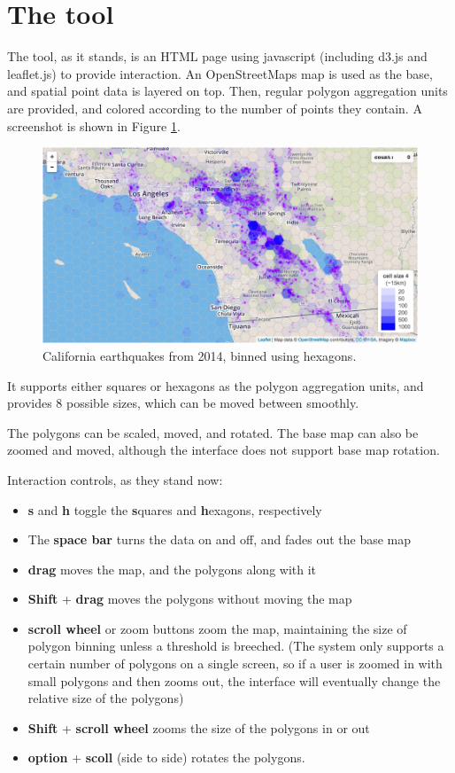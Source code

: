 \documentclass{article}\usepackage[]{graphicx}\usepackage[]{color}
\begin{document}
\section{The tool}

The tool, as it stands, is an HTML page using javascript (including d3.js and leaflet.js) to provide interaction. An OpenStreetMaps map is used as the base, and spatial point data is layered on top. Then, regular polygon aggregation units are provided, and colored according to the number of points they contain. A screenshot is shown in Figure \ref{tool}.

\begin{figure}[htbp]
\begin{centering}
\includegraphics[width=\textwidth]{img/tool}
\caption{California earthquakes from 2014, binned using hexagons.}\label{tool}
\end{centering}
\end{figure}

It supports either squares or hexagons as the polygon aggregation units, and provides 8 possible sizes, which can be moved between smoothly. 

The polygons can be scaled, moved, and rotated. The base map can also be zoomed and moved, although the interface does not support base map rotation. 

Interaction controls, as they stand now:
\begin{itemize}
\item \textbf{s} and \textbf{h} toggle the \textbf{s}quares and \textbf{h}exagons, respectively
\item The \textbf{space bar} turns the data on and off, and fades out the base map
\item \textbf{drag} moves the map, and the polygons along with it
\item \textbf{Shift} + \textbf{drag} moves the polygons without moving the map
\item \textbf{scroll wheel} or zoom buttons zoom the map, maintaining the size of polygon binning unless a threshold is breeched. (The system only supports a certain number of polygons on a single screen, so if a user is zoomed in with small polygons and then zooms out, the interface will eventually change the relative size of the polygons)
\item \textbf{Shift} + \textbf{scroll wheel} zooms the size of the polygons in or out
\item \textbf{option} + \textbf{scoll} (side to side) rotates the polygons. 
\end{itemize}
\end{document}
